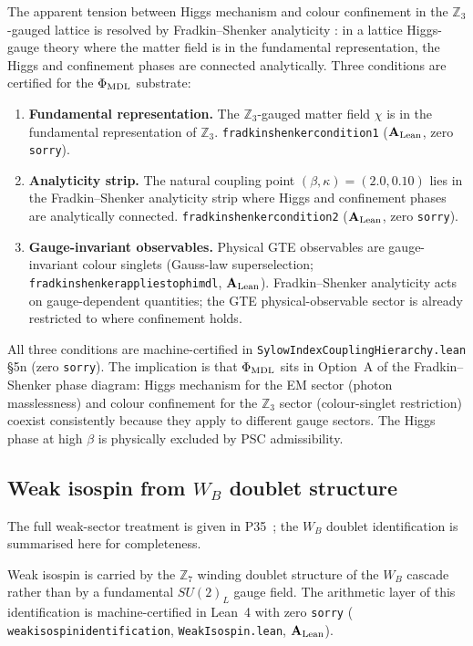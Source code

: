 \documentclass[11pt]{article}
\theoremstyle{remark}
\newcommand{\ZS}{\mathbb{Z}_7}
\newcommand{\ZZ}{\mathbb{Z}}
\newcommand{\phimdl}{\Phi_{\rm MDL}}
\newcommand{\lean}[1]{%
  \penalty-100
  \begingroup\def\_{\textunderscore\allowbreak}\texttt{#1}\endgroup}
\newcommand{\CatAL}{\ensuremath{\textbf{A}_{\rm Lean}}}
\begin{document}
The apparent tension between Higgs mechanism and colour confinement in the
$\ZZ_3$-gauged lattice is resolved by Fradkin--Shenker analyticity
\cite{FradkinShenker1979}:
in a lattice Higgs-gauge theory where the matter field is in the fundamental
representation, the Higgs and confinement phases are connected analytically.
Three conditions are certified for the $\phimdl$ substrate:

\begin{enumerate}[leftmargin=2em,label=\textbf{FS-C\arabic*.}]
\item \textbf{Fundamental representation.}
  The $\ZZ_3$-gauged matter field $\chi$ is in the fundamental representation
  of $\ZZ_3$.
  \lean{fradkin\_shenker\_condition1} (\CatAL{}, zero \texttt{sorry}).
\item \textbf{Analyticity strip.}
  The natural coupling point $(\beta,\kappa) = (2.0, 0.10)$ lies in the
  Fradkin--Shenker analyticity strip where Higgs and confinement phases are
  analytically connected.
  \lean{fradkin\_shenker\_condition2} (\CatAL{}, zero \texttt{sorry}).
\item \textbf{Gauge-invariant observables.}
  Physical GTE observables are gauge-invariant colour singlets (Gauss-law
  superselection; \lean{fradkin\_shenker\_applies\_to\_phimdl}, \CatAL{}).
  Fradkin--Shenker analyticity acts on gauge-dependent quantities; the GTE
  physical-observable sector is already restricted to where confinement holds.
\end{enumerate}

All three conditions are machine-certified in
\lean{SylowIndexCouplingHierarchy.lean} §5n (zero \texttt{sorry}).
The implication is that $\phimdl$ sits in Option~A of the Fradkin--Shenker
phase diagram: Higgs mechanism for the EM sector (photon masslessness) and
colour confinement for the $\ZZ_3$ sector (colour-singlet restriction) coexist
consistently because they apply to different gauge sectors.
The Higgs phase at high $\beta$ is physically excluded by PSC admissibility.

\subsection{Weak isospin from \texorpdfstring{$W_B$}{WB} doublet structure}
\label{ssec:isospin}

The full weak-sector treatment is given in P35~\cite{SpivackGTEUnification}; the $W_B$ doublet identification is summarised here for completeness.

Weak isospin is carried by the $\ZS$ winding doublet structure of the $W_B$
cascade rather than by a fundamental $SU(2)_L$ gauge field.
The arithmetic layer of this identification is machine-certified in Lean~4
with zero \texttt{sorry} (\lean{weak\_isospin\_identification},
\texttt{WeakIsospin.lean}, $\CatAL$).
\end{document}
